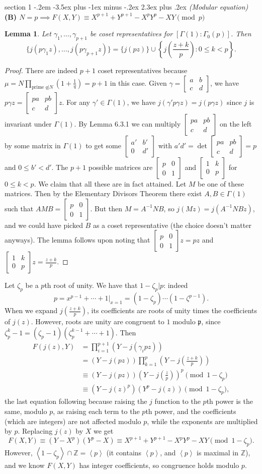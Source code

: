 \documentclass[12pt]{article}
\makeatletter
\theoremstyle{norm}
\newtheorem{lem}[thm]{Lemma}
\newcommand{\Z}[0]{\mathbb{Z}}
\newcommand{\mfp}[0]{\mathfrak{p}}
\newcommand{\ga}[0]{\gamma}
\newcommand{\Ga}[0]{\Gamma}
\newcommand{\bc}[1]{\left\{ {#1} \right\}}
\newcommand{\pa}[1]{\left( {#1} \right)}
\newcommand{\an}[1]{\left\langle {#1}\right\rangle}
\newcommand{\subprob}[1]{\noindent\textbf{#1}\\}
\newcommand{\pf}[2]{\pa{\frac{#1}{#2}}}
\newcommand{\smatt}[4]{
\left[
\begin{smallmatrix}
{#1}&{#2}\\
{#3}&{#4}
\end{smallmatrix}
\right]}
\newenvironment{problem}{\@startsection
       {section}
       {1}
       {-.2em}
       {-3.5ex plus -1ex minus -.2ex}
       {2.3ex plus .2ex}
       {\pagebreak[3]%
       \large\bf\noindent{Problem }
       }
       }
       {%
       }
\makeatother
\begin{document}
\begin{problem}{\it (Modular equation)}
\subprob{(B) $N=p\implies F(X,Y)\equiv X^{p+1}+Y^{p+1}-X^pY^p-XY\pmod{p}$}
\begin{lem}
Let $\ga_1,\ldots, \ga_{p+1}$ be coset representatives for $[\Ga(1):\Ga_0(p)]$. Then 
\[
\{j(p\ga_1z),\ldots,j(p\ga_{p+1}z)\}=\{j(pz)\}\cup\bc{j\pf{z+k}{p}:0\le k<p}.
\]
\end{lem}
\begin{proof}
There are indeed $p+1$ coset representatives because $\mu=N\prod_{\text{prime } q|N}\pa{1+\frac{1}{q}}=p+1$ in this case.
%
Given $\ga=\smatt abcd$, we have $p\ga z=\smatt{pa}{pb}cdz$. 
For any $\ga'\in \Ga(1)$, we have $j(\ga'p\ga z)=j(p\ga z)$ since $j$ is invariant under $\Ga(1)$. By Lemma 6.3.1 we can multiply $\smatt{pa}{pb}cd$ on the left by some matrix in $\Ga(1)$ to get some $\smatt {a'}{b'}0{d'}$ with $a'd'=\det\smatt{pa}{pb}cd=p$ and $0\le b'<d'$. The $p+1$ possible matrices are $\smatt p001$ and $\smatt 1{k}0p$ for $0\leq k<p$. We claim that all these are in fact attained. Let $M$ be one of these matrices. Then by the Elementary Divisors Theorem there exist $A,B\in \Ga(1)$ such that $AMB=\smatt p001$. But then $M=A^{-1}NB$, so $j(Mz)=j(A^{-1}NBz)$, and we could have picked $B$ as a coset representative (the choice doesn't matter anyways). The lemma follows upon noting that $\smatt p001z=pz$ and $\smatt 1{k}0pz=\frac{z+k}{p}$.
\end{proof}
Let $\zeta_p$ be a $p$th root of unity. %
We have that $1-\zeta_p|p$: indeed 
\[
p=x^{p-1}+\cdots +1|_{x=1}=(1-\zeta_p)\cdots (1-\zeta^{p-1}).
\]
When we expand $j\pf{z+k}{p}$, its coefficients are roots of unity times the coefficients of $j(z)$. However, roots are unity are congruent to $1$ modulo $\mfp$, since $\zeta_p^k-1=(\zeta_p-1)(\zeta_p^{k-1}+\cdots +1)$. Then
\begin{align*}
F(j(z),Y)%
&=\prod_{i=1}^{p+1}(Y-j(\ga_ipz))\\
&=(Y-j(pz))\prod_{k=1}^{p}\pa{Y-j\pf{z+k}{p}}\\
&\equiv (Y-j(pz))\pa{Y-j\pa{\frac zp}}^p\pmod{1-\zeta_p} \\
&\equiv (Y-j(z)^p)\pa{Y^p-j(z)}\pmod{1-\zeta_p},
\end{align*}
the last equation following because raising the $j$ function to the $p$th power is the same, modulo $p$, as raising each term to the $p$th power, and the coefficients (which are integers) are not affected modulo $p$, while the exponents are multiplied by $p$. 
Replacing $j(z)$ by $X$ we get
\[F(X,Y)\equiv (Y-X^p)(Y^p-X)\equiv X^{p+1}+Y^{p+1}-X^pY^p-XY \pmod{1-\zeta_p}.\]
However, $\an{1-\zeta_p}\cap \Z=\an{p}$ (it contains $\an{p}$, and $\an{p}$ is maximal in $\Z$), and we know $F(X,Y)$ has integer coefficients, so congruence holds modulo $p$.
\end{problem}
\end{document}
